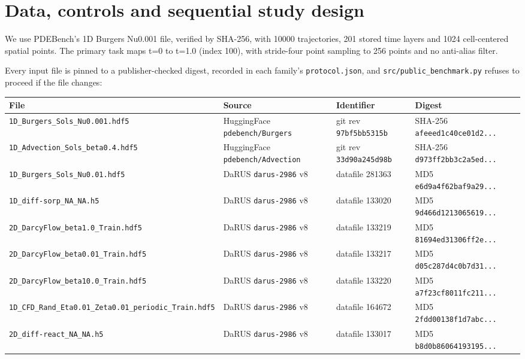 \documentclass[preprint,12pt]{elsarticle}
\begin{document}
\section{Data, controls and sequential study design}

We use PDEBench's 1D Burgers Nu0.001 file, verified by SHA-256, with 10000 trajectories, 201 stored time layers and 1024 cell-centered spatial points. The primary task maps t=0 to t=1.0 (index 100), with stride-four point sampling to 256 points and no anti-alias filter.

Every input file is pinned to a publisher-checked digest, recorded in each family's \texttt{protocol.json}, and \texttt{src/public\_benchmark.py} refuses to proceed if the file changes:

\begin{center}
\begin{adjustbox}{max width=\linewidth}
\small
\begin{tabular}{llll}
\toprule
File & Source & Identifier & Digest \\
\midrule
\texttt{1D\_Burgers\_Sols\_Nu0.001.hdf5} & HuggingFace \texttt{pdebench/Burgers} & git rev \texttt{97bf5bb5315b} & SHA-256 \texttt{afeeed1c40ce01d2...} \\
\texttt{1D\_Advection\_Sols\_beta0.4.hdf5} & HuggingFace \texttt{pdebench/Advection} & git rev \texttt{33d90a245d98b} & SHA-256 \texttt{d973ff2bb3c2a5ed...} \\
\texttt{1D\_Burgers\_Sols\_Nu0.01.hdf5} & DaRUS \texttt{darus-2986} v8 & datafile 281363 & MD5 \texttt{e6d9a4f62baf9a29...} \\
\texttt{1D\_diff-sorp\_NA\_NA.h5} & DaRUS \texttt{darus-2986} v8 & datafile 133020 & MD5 \texttt{9d466d1213065619...} \\
\texttt{2D\_DarcyFlow\_beta1.0\_Train.hdf5} & DaRUS \texttt{darus-2986} v8 & datafile 133219 & MD5 \texttt{81694ed31306ff2e...} \\
\texttt{2D\_DarcyFlow\_beta0.01\_Train.hdf5} & DaRUS \texttt{darus-2986} v8 & datafile 133217 & MD5 \texttt{d05c287d4c0b7d31...} \\
\texttt{2D\_DarcyFlow\_beta10.0\_Train.hdf5} & DaRUS \texttt{darus-2986} v8 & datafile 133220 & MD5 \texttt{a7f23cf8011fc211...} \\
\texttt{1D\_CFD\_Rand\_Eta0.01\_Zeta0.01\_periodic\_Train.hdf5} & DaRUS \texttt{darus-2986} v8 & datafile 164672 & MD5 \texttt{2fdd00138f1d7abc...} \\
\texttt{2D\_diff-react\_NA\_NA.h5} & DaRUS \texttt{darus-2986} v8 & datafile 133017 & MD5 \texttt{b8d0b86064193195...} \\
\bottomrule
\end{tabular}
\end{adjustbox}
\end{center}
\end{document}
